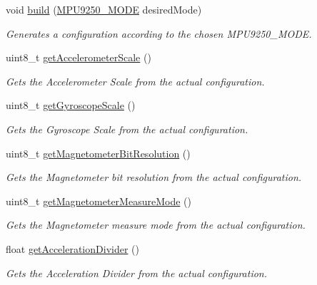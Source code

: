 \begin{DoxyCompactItemize}
\item 
void \hyperlink{class_m_p_u9250_config_a3c2cf2621f92829e9c70179f87a91af9}{build} (\hyperlink{_m_p_u9250_config_8h_a5e7bb14760657986206f4a28ef647252}{M\+P\+U9250\+\_\+\+M\+O\+D\+E} desired\+Mode)
\begin{DoxyCompactList}\small\item\em Generates a configuration according to the chosen M\+P\+U9250\+\_\+\+M\+O\+D\+E. \end{DoxyCompactList}\item 
uint8\+\_\+t \hyperlink{class_m_p_u9250_config_aab04b36aa28553cb62328a1cfe03f570}{get\+Accelerometer\+Scale} ()
\begin{DoxyCompactList}\small\item\em Gets the Accelerometer Scale from the actual configuration. \end{DoxyCompactList}\item 
uint8\+\_\+t \hyperlink{class_m_p_u9250_config_a7b4ab6bdb48c017fb54320f52a15a4ea}{get\+Gyroscope\+Scale} ()
\begin{DoxyCompactList}\small\item\em Gets the Gyroscope Scale from the actual configuration. \end{DoxyCompactList}\item 
uint8\+\_\+t \hyperlink{class_m_p_u9250_config_afa11fbc5e4d69462d3adef5ba8a38930}{get\+Magnetometer\+Bit\+Resolution} ()
\begin{DoxyCompactList}\small\item\em Gets the Magnetometer bit resolution from the actual configuration. \end{DoxyCompactList}\item 
uint8\+\_\+t \hyperlink{class_m_p_u9250_config_a57a632ebe42c7fe35188849f873d654f}{get\+Magnetometer\+Measure\+Mode} ()
\begin{DoxyCompactList}\small\item\em Gets the Magnetometer measure mode from the actual configuration. \end{DoxyCompactList}\item 
float \hyperlink{class_m_p_u9250_config_a536c3c06609e45d5e2675529988515e8}{get\+Acceleration\+Divider} ()
\begin{DoxyCompactList}\small\item\em Gets the Acceleration Divider from the actual configuration. \end{DoxyCompactList}\item 

\end{DoxyCompactItemize}
